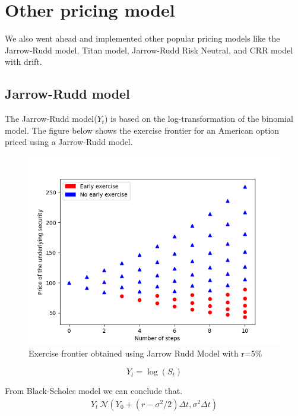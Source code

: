 \documentclass[12pt]{report}
\begin{document}
\section*{Other pricing model}

We also went ahead and implemented other popular pricing models like the Jarrow-Rudd model, Titan model, Jarrow-Rudd Risk Neutral, and CRR model with drift. 
\linebreak
\linebreak
\subsection*{Jarrow-Rudd model}
The Jarrow-Rudd model($Y_t$) is based on the log-transformation of the binomial model. The figure below shows the exercise frontier for an American option priced using a Jarrow-Rudd model. 

\begin{figure}[H]
	\centering
	\includegraphics[scale=0.6]{plots/JRmodel.png}
	\caption{Exercise frontier obtained using Jarrow Rudd Model with r=5\%}
\end{figure}

\begin{equation*}
	Y_t = \log(S_t)
\end{equation*}

From Black-Scholes model we can conclude that.
\begin{equation*}
	\begin{aligned}
		Y_t ~ \mathcal{N}(Y_0 + (r-\sigma^2/2)\Delta t,\sigma^2\Delta t)
	\end{aligned}	
\end{equation*}
\end{document}
